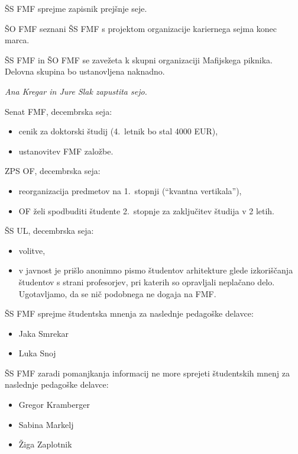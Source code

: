 \documentclass{seja}
\begin{document}
\begin{ad}
    \item
    \begin{sklep*}
        ŠS FMF sprejme zapisnik prejšnje seje.
    \end{sklep*}
    \item
    ŠO FMF seznani ŠS FMF s projektom organizacije kariernega sejma konec marca.
    \item
    \begin{sklep*}
        ŠS FMF in ŠO FMF se zavežeta k skupni organizaciji Mafijskega piknika. Delovna skupina bo ustanovljena naknadno.
    \end{sklep*}

    \textit{Ana Kregar in Jure Slak zapustita sejo.}
    \item
   Senat FMF, decembrska seja:
  \begin{itemize}
      \item cenik za doktorski študij (4.~letnik bo stal 4000 EUR),
    \item ustanovitev FMF založbe.
  \end{itemize}
  ZPS OF, decembrska seja:
  \begin{itemize}
      \item reorganizacija predmetov na 1.~stopnji (``kvantna vertikala''),
      \item OF želi spodbuditi študente 2.~stopnje za zaključitev študija v 2 letih.
  \end{itemize}
  ŠS UL, decembrska seja:
  \begin{itemize}
      \item volitve,
      \item v javnost je prišlo anonimno pismo študentov arhitekture glede izkoriščanja študentov s strani profesorjev, pri katerih so opravljali neplačano delo. Ugotavljamo, da se nič podobnega ne dogaja na FMF.
  \end{itemize}

  \item
    \begin{sklep*}
    ŠS FMF sprejme študentska mnenja za naslednje pedagoške delavce:
        \begin{itemize}
            \item Jaka Smrekar
            \item Luka Snoj
        \end{itemize}
    ŠS FMF zaradi pomanjkanja informacij ne more sprejeti študentskih mnenj za naslednje pedagoške delavce:
        \begin{itemize}
            \item Gregor Kramberger
            \item Sabina Markelj
            \item Žiga Zaplotnik
        \end{itemize}
    \end{sklep*}


\end{ad}
\end{document}
